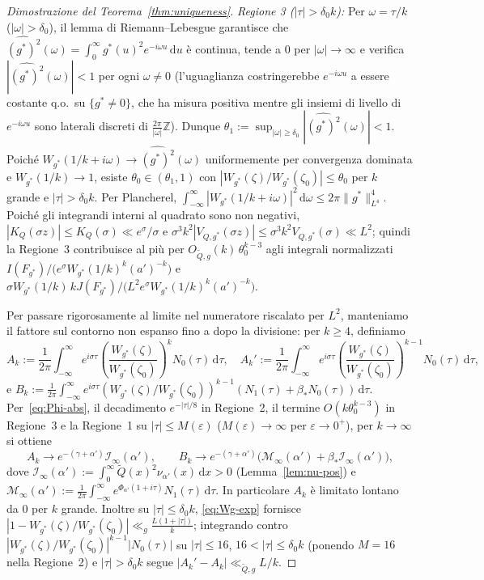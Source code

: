 \documentclass[11pt, reqno]{amsart}
\theoremstyle{remark}
\numberwithin{equation}{section}
\newcommand{\dd}{\,\mathrm{d}}
\begin{document}
\begin{proof}[Dimostrazione del Teorema~\ref{thm:uniqueness}]
\emph{Regione 3 ($|\tau| > \delta_0 k$):} Per $\omega = \tau/k$ ($|\omega| > \delta_0$), il lemma di
Riemann--Lebesgue garantisce che $\widehat{(g^*)^2}(\omega) = \int_0^\infty g^*(u)^2 e^{-i\omega u}\dd u$
è continua, tende a $0$ per $|\omega| \to \infty$ e verifica $|\widehat{(g^*)^2}(\omega)| < 1$ per ogni
$\omega \neq 0$ (l'uguaglianza costringerebbe $e^{-i\omega u}$ a essere costante q.o.\ su $\{g^* \neq 0\}$,
che ha misura positiva mentre gli insiemi di livello di $e^{-i\omega u}$ sono laterali discreti di
$\frac{2\pi}{|\omega|}\mathbb{Z}$). Dunque $\theta_1 := \sup_{|\omega| \ge \delta_0}|\widehat{(g^*)^2}(\omega)| < 1$.
Poiché $W_{g^*}(1/k+i\omega) \to \widehat{(g^*)^2}(\omega)$ uniformemente per convergenza dominata e
$W_{g^*}(1/k) \to 1$, esiste $\theta_0 \in (\theta_1, 1)$ con $|W_{g^*}(\zeta)/W_{g^*}(\zeta_0)| \le \theta_0$
per $k$ grande e $|\tau| > \delta_0 k$. Per Plancherel, $\int_{-\infty}^\infty |W_{g^*}(1/k+i\omega)|^2\dd\omega \le 2\pi\|g^*\|_{L^4}^4$.
Poiché gli integrandi interni al quadrato sono non negativi, $|K_Q(\sigma z)| \le K_Q(\sigma) \ll e^\sigma/\sigma$
e $\sigma^3 k^2 |V_{Q,g^*}(\sigma z)| \le \sigma^3 k^2 V_{Q,g^*}(\sigma) \ll L^2$; quindi la Regione~3 contribuisce
al più per $O_{\widetilde{Q},g}(k)\,\theta_0^{k-3}$ agli integrali normalizzati
$I(F_{g^*})/\bigl(e^\sigma W_{g^*}(1/k)^k (a')^{-k}\bigr)$ e $\sigma W_{g^*}(1/k)\, k J(F_{g^*})/\bigl(L^2 e^\sigma W_{g^*}(1/k)^k (a')^{-k}\bigr)$.

Per passare rigorosamente al limite nel numeratore riscalato per $L^2$, manteniamo il fattore sul
contorno non espanso fino a dopo la divisione: per $k \ge 4$, definiamo
\[
A_k := \frac{1}{2\pi}\int_{-\infty}^\infty e^{i\sigma\tau}\!\left(\frac{W_{g^*}(\zeta)}{W_{g^*}(\zeta_0)}\right)^{\!k} N_0(\tau)\dd\tau,
\quad
A_k' := \frac{1}{2\pi}\int_{-\infty}^\infty e^{i\sigma\tau}\!\left(\frac{W_{g^*}(\zeta)}{W_{g^*}(\zeta_0)}\right)^{\!k-1} N_0(\tau)\dd\tau,
\]
e $B_k := \frac{1}{2\pi}\int_{-\infty}^\infty e^{i\sigma\tau}(W_{g^*}(\zeta)/W_{g^*}(\zeta_0))^{k-1}(N_1(\tau) + \beta_* N_0(\tau))\dd\tau$.
Per~\eqref{eq:Phi-abs}, il decadimento $e^{-|\tau|/8}$ in Regione~2, il termine $O(k\theta_0^{k-3})$ in
Regione~3 e la Regione~1 su $|\tau| \le M(\varepsilon)$ ($M(\varepsilon) \to \infty$ per $\varepsilon \to 0^+$),
per $k \to \infty$ si ottiene
\[
A_k \to e^{-(\gamma+\alpha')}\mathcal{I}_\infty(\alpha'),
\qquad
B_k \to e^{-(\gamma+\alpha')}\bigl(\mathcal{M}_\infty(\alpha') + \beta_*\mathcal{I}_\infty(\alpha')\bigr),
\]
dove $\mathcal{I}_\infty(\alpha') := \int_0^\infty \widetilde{Q}(x)^2 \nu_{\alpha'}(x)\dd x > 0$ (Lemma~\ref{lem:nu-pos})
e $\mathcal{M}_\infty(\alpha') := \frac{1}{2\pi}\int_{-\infty}^\infty e^{\Phi_{\alpha'}(1+i\tau)} N_1(\tau)\dd\tau$.
In particolare $A_k$ è limitato lontano da $0$ per $k$ grande. Inoltre su $|\tau| \le \delta_0 k$,
\eqref{eq:Wg-exp} fornisce $|1 - W_{g^*}(\zeta)/W_{g^*}(\zeta_0)| \ll_g \frac{L(1+|\tau|)}{k}$; integrando contro
$|W_{g^*}(\zeta)/W_{g^*}(\zeta_0)|^{k-1}|N_0(\tau)|$ su $|\tau| \le 16$, $16 < |\tau| \le \delta_0 k$ (ponendo $M = 16$ nella Regione~2) e $|\tau| > \delta_0 k$
segue $|A_k' - A_k| \ll_{\widetilde{Q},g} L/k$.


\end{proof}
\end{document}
